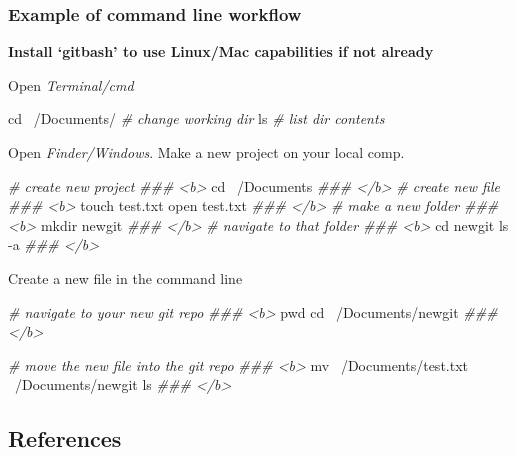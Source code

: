 \documentclass[10,portrait]{article}
\newenvironment{Shaded}{\begin{snugshade}}{\end{snugshade}}
\newcommand{\CommentTok}[1]{\textcolor[rgb]{0.56,0.35,0.01}{\textit{#1}}}
\newcommand{\FunctionTok}[1]{\textcolor[rgb]{0.00,0.00,0.00}{#1}}
\newcommand{\BuiltInTok}[1]{#1}
\newcommand{\ExtensionTok}[1]{#1}
\newcommand{\NormalTok}[1]{#1}
\begin{document}
\subsubsection{Example of command line
workflow}\label{example-of-command-line-workflow}

\textbf{Install `gitbash' to use Linux/Mac capabilities if not already}

Open \emph{Terminal/cmd}

\begin{Shaded}
\begin{Highlighting}[]
\BuiltInTok{cd}\NormalTok{ ~/Documents/ }\CommentTok{# change working dir}
\FunctionTok{ls} \CommentTok{# list dir contents      }
\end{Highlighting}
\end{Shaded}

Open \emph{Finder/Windows}. Make a new project on your local comp.

\begin{Shaded}
\begin{Highlighting}[]
\CommentTok{# create new project  }
\CommentTok{### <b> }
\BuiltInTok{cd}\NormalTok{ ~/Documents}
\CommentTok{### </b>}
\CommentTok{# create new file }
\CommentTok{### <b> }
\FunctionTok{touch}\NormalTok{ test.txt  }
\ExtensionTok{open}\NormalTok{ test.txt  }
\CommentTok{### </b> }
\CommentTok{# make a new folder  }
\CommentTok{### <b> }
\FunctionTok{mkdir}\NormalTok{ newgit  }
\CommentTok{### </b>}
\CommentTok{# navigate to that folder  }
\CommentTok{### <b>}
\BuiltInTok{cd}\NormalTok{ newgit}
\FunctionTok{ls}\NormalTok{ -a  }
\CommentTok{### </b>   }
\end{Highlighting}
\end{Shaded}

Create a new file in the command line

\begin{Shaded}
\begin{Highlighting}[]
\CommentTok{# navigate to your new git repo  }
\CommentTok{### <b>}
\BuiltInTok{pwd}  
\BuiltInTok{cd}\NormalTok{ ~/Documents/newgit}
\CommentTok{### </b> }

\CommentTok{# move the new file into the git repo      }
\CommentTok{### <b> }
\FunctionTok{mv}\NormalTok{ ~/Documents/test.txt ~/Documents/newgit}
\FunctionTok{ls}  
\CommentTok{### </b> }
\end{Highlighting}
\end{Shaded}

\subsection{References}\label{references}
\end{document}
